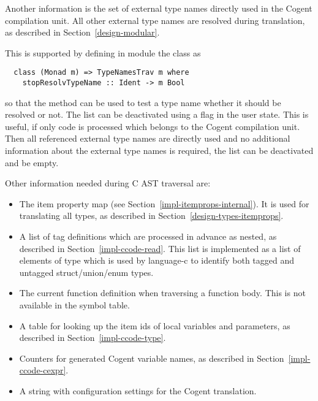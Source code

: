 Another information is the set of external type names directly used in the Cogent compilation unit. All other 
external type names are resolved during translation, as described in Section~\ref{design-modular}.

This is supported by defining in module  the class  as
\begin{verbatim}
  class (Monad m) => TypeNamesTrav m where
    stopResolvTypeName :: Ident -> m Bool
\end{verbatim}
so that the method  can be used to test a type name whether it should be resolved or not.
The list can be deactivated using a flag in the user state. This is useful, if only code is processed which belongs
to the Cogent compilation unit. Then all referenced external type names are directly used and no additional information about
the external type names is required, the list can be deactivated and be empty.

Other information needed during C AST traversal are:
\begin{itemize}
\item The item property map (see Section~\ref{impl-itemprops-internal}).
It is used for translating all types, as described in Section~\ref{design-types-itemprops}.
\item A list of tag definitions which are processed in advance as nested, as described in 
Section~\ref{impl-ccode-read}. This list is implemented as a list of elements of type  which is used
by language-c to identify both tagged and untagged struct/union/enum types.
\item The current function definition when traversing a function body. This is not available in the symbol table.
\item A table for looking up the item ids of local variables and parameters, as described in Section~\ref{impl-ccode-type}.
\item Counters for generated Cogent variable names, as described in Section~\ref{impl-ccode-cexpr}.
\item A string with configuration settings for the Cogent translation.
\end{itemize}

